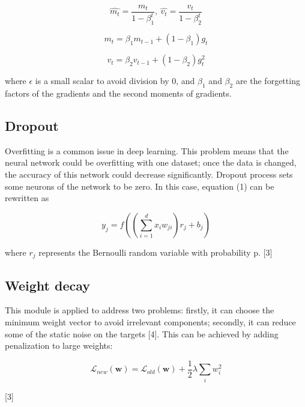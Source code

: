 \documentclass[twoside,twocolumn]{article}
\begin{document}
\begin{equation}
\label{eq:5}
\widehat{m_t}=\frac{m_t}{1-\beta_1^t},\ \widehat{v_t}=\frac{v_t}{1-\beta_2^t}
\end{equation}

\begin{equation}
\label{eq:6}
m_t=\beta_1m_{t-1}+(1-\beta_1)g_t
\end{equation}

\begin{equation}
\label{eq:7}
v_t=\beta_2v_{t-1}+(1-\beta_2)g_t^2
\end{equation}

\noindent where $\epsilon$ is a small scalar to avoid division by 0, and $\beta_1$ and $\beta_2$ are the forgetting factors of the gradients and the second moments of gradients. 

\subsection{Dropout}

Overfitting is a common issue in deep learning. This problem means that the neural network could be overfitting with one dataset; once the data is changed, the accuracy of this network could decrease significantly. Dropout process sets some neurons of the network to be zero. In this case, equation (1) can be rewritten as 

\begin{equation}
\label{eq:8}
y_j=f((\sum_{i=1}^{d}x_iw_{ji})r_j+b_j)
\end{equation}

\noindent where $r_j$ represents the Bernoulli random variable with probability p. [3]

\subsection{Weight decay}

This module is applied to address two problems: firstly, it can choose the minimum weight vector to avoid irrelevant components; secondly, it can reduce some of the static noise on the targets [4]. This can be achieved by adding penalization to large weights:

\begin{equation}
\label{eq:9}
\mathcal{L}_{new}(\textbf{w})=\mathcal{L}_{old}(\textbf{w})+\frac{1}{2}\lambda\sum_{i}w_i^2
\end{equation}

[3]
\end{document}
